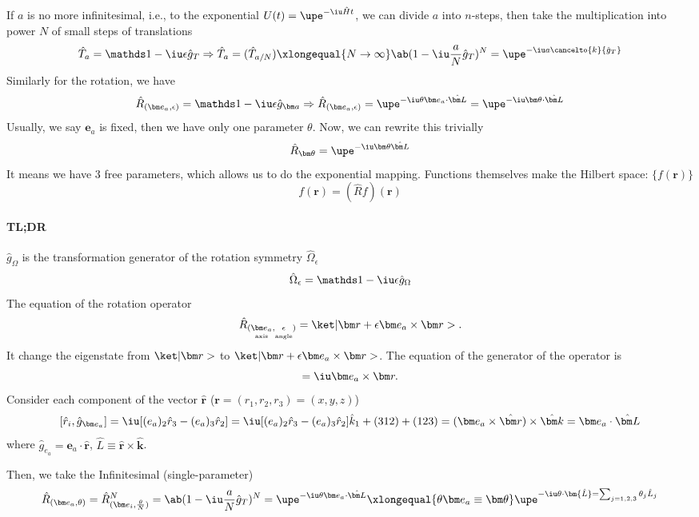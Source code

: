 If $a$ is no more infinitesimal, i.e.,
to the exponential $U(t) = \upe^{-\iu\hat Ht}$,
we can divide $a$ into $n$-steps, then take the multiplication into power $N$ of
small steps of translations
\[
  \hat T_a = \identity - \iu\epsilon \hat g_T \Rightarrow
  \hat T_a = (\hat T_{a/N}) \xlongequal{N\to\infty}
  \ab(1- \iu\frac aN \hat g_T)^N = \upe^{-\iu a\cancelto{k}{\hat g_T}}
\]
Similarly for the rotation, we have
\[
  \hat R_{(\bm e_a,\epsilon)} = \identity - \iu\epsilon \hat g_{\bm a}
  \Rightarrow
  \hat R_{(\bm e_a,\epsilon)} = \upe^{-\iu\theta \bm e_a \cdot \hat{\bm L}}
= \upe^{-\iu \bm\theta \cdot \hat{\bm L}}
\]
Usually, we say $\bm e_a$ is fixed, then we have only one parameter $\theta$.
Now, we can rewrite this trivially
\[
  \hat R_{\bm\theta} = \upe^{-\iu\bm\theta\hat{\bm L}}
\]
It means we have 3 free parameters, which allows us to do the exponential
mapping.
Functions themselves make the Hilbert space: $\{f(\bm r)\}$
\[
  f(\bm r) = (\hat Rf)(\bm r)
\]

\paragraph{TL;DR}

$\hat g_\Omega$ is the transformation generator of the rotation
symmetry $\hat\Omega_\epsilon$
\begin{equation}
  \hat \Omega_\epsilon = \identity - \iu\epsilon \hat g_\Omega
\end{equation}
The equation of the rotation operator
\begin{equation}
  \hat R_
    {(\underset{\text{axis}}{\bm e_a},
  \underset{\text{angle}}{\vphantom{\bm e_a}\epsilon})} =
  \ket|\bm r + \epsilon \bm e_a \times \bm r>.
\end{equation}
It change the eigenstate from $\ket|\bm r>$
to $\ket|\bm r + \epsilon \bm e_a \times \bm r>$.
The equation of the generator of the operator is
\begin{equation}
  [\hat{\bm r}, \hat g_{\bm e_a}] = \iu \bm e_a \times \bm r.
\end{equation}
Consider each component of the vector $\hat{\bm r}$
($\bm r = (r_1, r_2, r_3) = (x, y, z)$)
\[
  [\hat r_i, \hat g_{\bm e_a}] = \iu [(e_a)_2\hat r_3 - (e_a)_3\hat r_2]
= \iu [(e_a)_2\hat r_3 - (e_a)_3\hat r_2] \hat k_1 + (312) + (123)
= (\bm e_a \times \hat{\bm r}) \times \hat{\bm k} = \bm e_a \cdot \hat{\bm L}
\]
where $\hat g_{e_a} = \bm e_a \cdot \hat{\bm r}$,
$\hat L \equiv \hat{\bm r} \times \hat{\bm k}$.

Then, we take the Infinitesimal (single-parameter)
\[
  \hat R_{(\bm e_a, \theta)} = \hat R_{(\bm e_i, \frac\theta N)}^N
= \ab(1- \iu\frac aN \hat g_T)^N = \upe^{-\iu \theta \bm e_a \cdot \hat{\bm L}}
\xlongequal{\theta \bm e_a \equiv \bm\theta}
  \upe^{-\iu\theta \cdot \bm{\hat L} = \sum_{j = 1,2,3} \theta_j \hat L_j}
\]

